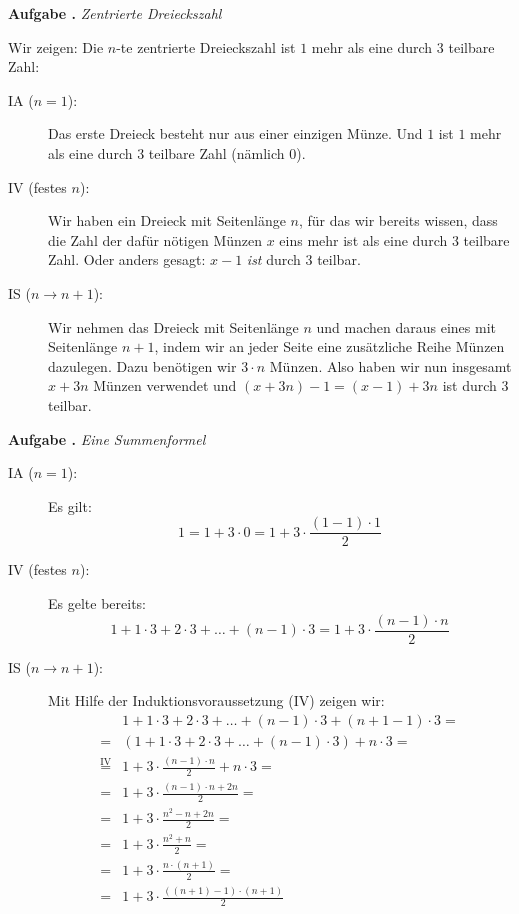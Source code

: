 \documentclass[a4paper,ngerman,12pt]{scrartcl}
\theoremstyle{definition}
\theoremstyle{plain}
\theoremstyle{remark}
\newlength{\aufgabenskip}
\newcounter{aufgabennummer}
\newenvironment{aufgabe}[1]{
	\addtocounter{aufgabennummer}{1}
	\textbf{Aufgabe \theaufgabennummer.} \emph{#1} \par
}{\vspace{\aufgabenskip}}
\begin{document}
\begin{aufgabe}{Zentrierte Dreieckszahl}
	Wir zeigen: Die $n$-te zentrierte Dreieckszahl ist $1$ mehr als eine durch $3$ teilbare Zahl:
	
	\begin{description}
		\item[IA ($n=1$):] Das erste Dreieck besteht nur aus einer einzigen Münze. Und $1$ ist $1$ mehr als eine durch $3$ teilbare Zahl (nämlich $0$).
		\item[IV (festes $n$):] Wir haben ein Dreieck mit Seitenlänge $n$, für das wir bereits wissen, dass die Zahl der dafür nötigen Münzen $x$ eins mehr ist als eine durch $3$ teilbare Zahl. Oder anders gesagt: $x-1$ \emph{ist} durch $3$ teilbar.
		\item[IS ($n\to n+1$):] Wir nehmen das Dreieck mit Seitenlänge $n$ und machen daraus eines mit Seitenlänge $n+1$, indem wir an jeder Seite eine zusätzliche Reihe Münzen dazulegen. Dazu benötigen wir $3\cdot n$ Münzen. Also haben wir nun insgesamt $x + 3n$ Münzen verwendet und $(x+3n)-1 = (x-1)+3n$ ist durch $3$ teilbar.
	\end{description}
\end{aufgabe}


\begin{aufgabe}{Eine Summenformel}
	\begin{description}
	\item[IA ($n=1$):] Es gilt:
		\[1 = 1+3\cdot 0 = 1 + 3\cdot\frac{(1-1)\cdot 1}{2}\]
	\item[IV (festes $n$):] Es gelte bereits:
		\[1 + 1\cdot3 + 2\cdot3 + \dots + (n-1)\cdot 3 = 1 + 3\cdot\frac{(n-1)\cdot n}{2}\] 
	\item[IS ($n\to n+1$):] Mit Hilfe der Induktionsvoraussetzung (IV) zeigen wir:
		\begin{align*}
			&1 + 1\cdot3 + 2\cdot3 + \dots + (n-1)\cdot 3 + (n+1-1)\cdot 3 = \\
			=&  \left(1 + 1\cdot3 + 2\cdot3 + \dots + (n-1)\cdot 3\right) + n\cdot 3 = \\
			\overset{\text{IV}}{=}& 1 + 3\cdot\frac{(n-1)\cdot n}{2} + n\cdot 3 = \\
			=& 1 + 3\cdot \frac{(n-1)\cdot n + 2n}{2} = \\
			=& 1 + 3\cdot \frac{n^2 - n + 2n}{2} = \\
			=& 1 + 3\cdot \frac{n^2 + n}{2} = \\
			=& 1 + 3\cdot\frac{n\cdot (n+1)}{2} = \\
			=& 1 + 3\cdot\frac{((n+1)-1)\cdot (n+1)}{2}
		\end{align*} 
	\end{description}
\end{aufgabe}
\end{document}
